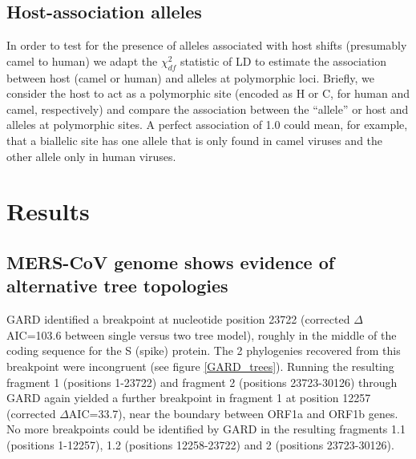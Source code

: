 \documentclass[11pt,oneside,letterpaper]{article}
\begin{document}
\subsection*{Host-association alleles}
In order to test for the presence of alleles associated with host shifts (presumably camel to human) we adapt the $\chi^{2}_{df}$ \citep{zhao2005} statistic of LD to estimate the association between host (camel or human) and alleles at polymorphic loci.
Briefly, we consider the host to act as a polymorphic site (encoded as H or C, for human and camel, respectively) and compare the association between the ``allele'' or host and alleles at polymorphic sites.
A perfect association of 1.0 could mean, for example, that a biallelic site has one allele that is only found in camel viruses and the other allele only in human viruses.

\section*{Results}
\subsection*{MERS-CoV genome shows evidence of alternative tree topologies}
GARD identified a breakpoint at nucleotide position 23722 (corrected $\Delta$AIC=103.6 between single versus two tree model), roughly in the middle of the coding sequence for the S (spike) protein.
The 2 phylogenies recovered from this breakpoint were incongruent (see figure \ref{GARD_trees}).
Running the resulting fragment 1 (positions 1-23722) and fragment 2 (positions 23723-30126) through GARD again yielded a further breakpoint in fragment 1 at position 12257 (corrected $\Delta$AIC=33.7), near the boundary between ORF1a and ORF1b genes.
No more breakpoints could be identified by GARD in the resulting fragments 1.1 (positions 1-12257), 1.2 (positions 12258-23722) and 2 (positions 23723-30126).
\end{document}
